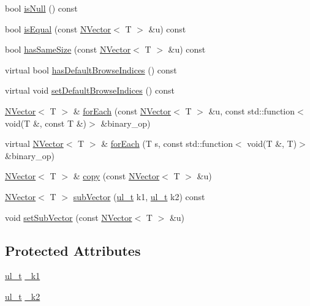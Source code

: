 \begin{DoxyCompactItemize}
\item 
bool \mbox{\hyperlink{class_n_vector_a6d2566f587ad233770ada3aeae0481e1}{is\+Null}} () const
\item 
bool \mbox{\hyperlink{class_n_vector_a496fb038e1612ce56c3b91a9c327c509}{is\+Equal}} (const \mbox{\hyperlink{class_n_vector}{N\+Vector}}$<$ T $>$ \&u) const
\item 
bool \mbox{\hyperlink{class_n_vector_aa9bef4cdf1e57cb0f2e7a3571bdb92a7}{has\+Same\+Size}} (const \mbox{\hyperlink{class_n_vector}{N\+Vector}}$<$ T $>$ \&u) const
\item 
virtual bool \mbox{\hyperlink{class_n_vector_a033460137c1098f8477e6a00e9c2872a}{has\+Default\+Browse\+Indices}} () const
\item 
virtual void \mbox{\hyperlink{class_n_vector_a7f7d365d6ba6e62f627828a528972268}{set\+Default\+Browse\+Indices}} () const
\item 
\mbox{\hyperlink{class_n_vector}{N\+Vector}}$<$ T $>$ \& \mbox{\hyperlink{class_n_vector_a703e598ebcdf39c8f0efa5c619a88d71}{for\+Each}} (const \mbox{\hyperlink{class_n_vector}{N\+Vector}}$<$ T $>$ \&u, const std\+::function$<$ void(T \&, const T \&)$>$ \&binary\+\_\+op)
\item 
virtual \mbox{\hyperlink{class_n_vector}{N\+Vector}}$<$ T $>$ \& \mbox{\hyperlink{class_n_vector_af5cd7c64bfd8eb2335f61d698d6dbf21}{for\+Each}} (T s, const std\+::function$<$ void(T \&, T)$>$ \&binary\+\_\+op)
\item 
\mbox{\hyperlink{class_n_vector}{N\+Vector}}$<$ T $>$ \& \mbox{\hyperlink{class_n_vector_a67128d2ff536b8ccd7a95cb680bd0431}{copy}} (const \mbox{\hyperlink{class_n_vector}{N\+Vector}}$<$ T $>$ \&u)
\item 
\mbox{\hyperlink{class_n_vector}{N\+Vector}}$<$ T $>$ \mbox{\hyperlink{class_n_vector_a8f24d84b8dafde55ba650fd02c188c06}{sub\+Vector}} (\mbox{\hyperlink{group___n_algebra_ga1b140a2034db3f5dfe18a987745df43a}{ul\+\_\+t}} k1, \mbox{\hyperlink{group___n_algebra_ga1b140a2034db3f5dfe18a987745df43a}{ul\+\_\+t}} k2) const
\item 
void \mbox{\hyperlink{class_n_vector_a6fd08a3790831a9ada035f720cb0b11f}{set\+Sub\+Vector}} (const \mbox{\hyperlink{class_n_vector}{N\+Vector}}$<$ T $>$ \&u)
\end{DoxyCompactItemize}
\subsection*{Protected Attributes}
\begin{DoxyCompactItemize}
\item 
\mbox{\hyperlink{group___n_algebra_ga1b140a2034db3f5dfe18a987745df43a}{ul\+\_\+t}} \mbox{\hyperlink{class_n_vector_a355ee9ef9436669e52d0ff4538f85e27}{\+\_\+k1}}
\item 
\mbox{\hyperlink{group___n_algebra_ga1b140a2034db3f5dfe18a987745df43a}{ul\+\_\+t}} \mbox{\hyperlink{class_n_vector_a6591512e0566996c42f3d74c8174385e}{\+\_\+k2}}
\end{DoxyCompactItemize}
